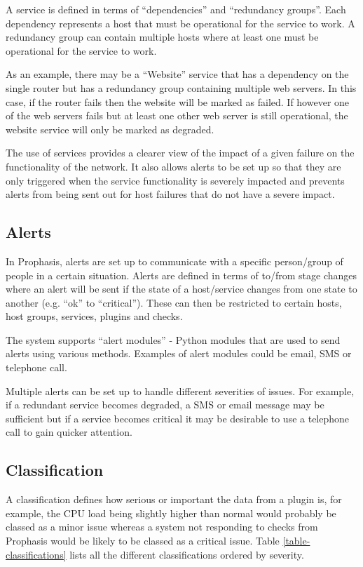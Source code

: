 \documentclass[bsc,logo,twoside,parskip,singlespacing,notimes]{infthesis}
\begin{document}
	A service is defined in terms of ``dependencies'' and ``redundancy groups''. Each
	dependency represents a host that must be operational for the service to work.
	A redundancy group can contain multiple hosts where at least one must be
	operational for the service to work.


	As an example, there may be a ``Website'' service that has a dependency on the
	single router but has a redundancy group containing multiple web servers.
	In this case, if the router fails then the website will be marked as failed.
	If however one of the web servers fails but at least one other web server is
	still operational, the website service will only be marked as degraded.


	The use of services provides a clearer view of the impact of a given failure on
	the functionality of the network.  It also allows alerts to be set up so that
	they are only triggered when the service functionality is severely impacted and
	prevents alerts from being sent out for host failures that do not have a severe
	impact.

\subsection{Alerts}

	In Prophasis, alerts are set up to communicate with a specific person/group of
	people in a certain situation.  Alerts are defined in terms of to/from stage
	changes where an alert will be sent if the state of a host/service changes from
	one state to another (e.g. ``ok'' to ``critical'').  These can then be restricted
	to certain hosts, host groups, services, plugins and checks.


	The system supports ``alert modules'' - Python modules that are used to send
	alerts using various methods.  Examples of alert modules could be email, SMS or
	telephone call.


	Multiple alerts can be set up to handle different severities of issues.  For
	example, if a redundant service becomes degraded, a SMS or email message may be
	sufficient but if a service becomes critical it may be desirable to use a
	telephone call to gain quicker attention.

\subsection{Classification}
	A classification defines how serious or important the data from a plugin is,
	for example, the CPU load being slightly higher than normal would probably be
	classed as a minor issue whereas a system not responding to checks from
	Prophasis would be likely to be classed as a critical issue. Table
	\ref{table-classifications} lists all the different classifications ordered
	by severity.
\end{document}
